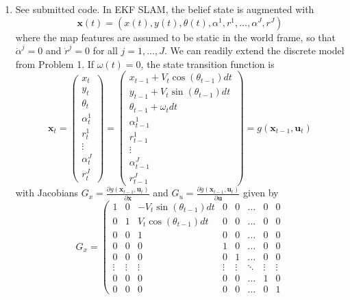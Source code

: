 \documentclass[12pt]{article}
\begin{document}
\begin{enumerate}
	\item See submitted code. In EKF SLAM, the belief state is augmented with
	\[
		\mathbf{x}(t) = (x(t), y(t), \theta(t), \alpha^1, r^1, \ldots, \alpha^J, r^J)
	\]
	where the map features are assumed to be static in the world frame, so that $\dot \alpha^j = 0$ and $\dot r^j = 0$ for all $j = 1,\ldots,J$. We can readily extend the discrete model from Problem 1. If $\omega(t) = 0$, the state transition function is
	\[
		\mathbf{x}_t = \left(\begin{array}{c}
		x_t \\
		y_t \\
		\theta_t \\
		\alpha_t^1 \\
		r_t^1 \\
		\vdots \\
		\alpha_t^J \\
		r_t^J
		\end{array}\right) = \left(\begin{array}{c}
		x_{t-1} + V_t\cos(\theta_{t-1})dt \\
		y_{t-1} + V_t\sin(\theta_{t-1})dt \\
		\theta_{t-1} + \omega_tdt \\
		\alpha_{t-1}^1 \\
		r_{t-1}^1 \\
		\vdots \\
		\alpha_{t-1}^J \\
		r_{t-1}^J
		\end{array}\right) = g(\mathbf{x}_{t-1}, \mathbf{u}_t)
	\]
	with Jacobians $G_x = \frac{\partial g(\mathbf{x}_{t-1}, \mathbf{u}_t)}{\partial \mathbf{x}}$ and $G_u = \frac{\partial g(\mathbf{x}_{t-1}, \mathbf{u}_t)}{\partial \mathbf{u}}$ given by
	\[
		G_x = \left(\begin{array}{cccccccc}
		1 & 0 & -V_t\sin(\theta_{t-1})dt & 0 & 0 & \ldots & 0 & 0 \\
		0 & 1 & V_t\cos(\theta_{t-1})dt & 0 & 0 & \ldots & 0 & 0 \\
		0 & 0 & 1 & 0 & 0 & \ldots & 0 & 0 \\
		0 & 0 & 0 & 1 & 0 & \ldots & 0 & 0 \\
		0 & 0 & 0 & 0 & 1 & \ldots & 0 & 0 \\
		\vdots & \vdots & \vdots & \vdots & \vdots & \ddots & \vdots & \vdots \\
		0 & 0 & 0 & 0 & 0 & \ldots & 1 & 0 \\
		0 & 0 & 0 & 0 & 0 & \ldots & 0 & 1

\end{array}\]
\end{enumerate}
\end{document}
